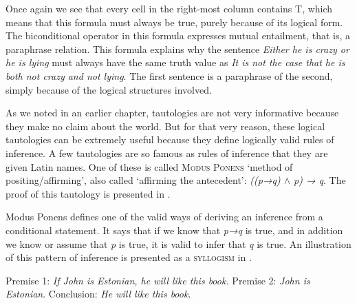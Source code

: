 Once again we see that every cell in the right-most column contains T, which means that this formula must always be true, purely because of its logical form. The biconditional operator in this formula expresses mutual entailment, that is, a paraphrase relation. This formula explains why the sentence \textit{Either he is crazy or he is lying} must always have the same truth value as \textit{It is not the case that he is both not crazy and not lying}. The first sentence is a paraphrase of the second, simply because of the logical structures involved.



As we noted in an earlier chapter, tautologies are not very informative because they make no claim about the world. But for that very reason, these logical tautologies can be extremely useful because they define logically valid rules of inference. A few tautologies are so famous as rules of inference that they are given Latin names. One of these is called \textsc{Modus Ponens} ‘method of positing/affirming’, also called ‘affirming the antecedent’: \textit{((p→q) $\wedge$ p) → q}. The proof of this tautology is presented in .



Modus Ponens defines one of the valid ways of deriving an inference from a conditional statement. It says that if we know that \textit{p→q} is true, and in addition we know or assume that \textit{p} is true, it is valid to infer that \textit{q} is true. An illustration of this pattern of inference is presented as a \textsc{syllogism} in .

\settowidth{}
\ea \label{ex:4.17}
Premise 1: \textit{If John is Estonian, he will like this book.}   
Premise 2: \textit{John is Estonian}.    
\FelixHRule
Conclusion: \textit{He will like this book}.   
\z


